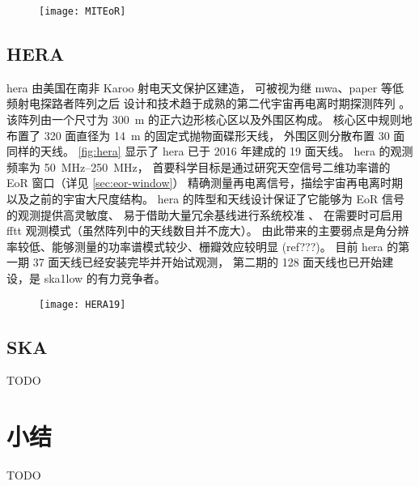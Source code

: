 \begin{figure}[!htb]
  \centering
  \texttt{[image: MITEoR]}
  \label{fig:miteor}
\end{figure}

\subsection{HERA}

\acf{hera} 由美国在南非 Karoo 射电天文保护区建造，
可被视为继 \acs{mwa}、\ac{paper} 等低频射电探路者阵列之后
设计和技术趋于成熟的第二代宇宙再电离时期探测阵列 \cite{deboer2017}。
该阵列由一个尺寸为 \SI{300}{\meter} 的正六边形核心区以及外围区构成。
核心区中规则地布置了 320 面直径为 \SI{14}{\meter} 的固定式抛物面碟形天线，
外围区则分散布置 30 面同样的天线。
\autoref{fig:hera} 显示了 \acs{hera} 已于 2016 年建成的 19 面天线。
\acs{hera} 的观测频率为 \SIrange{50}{250}{\MHz}，
首要科学目标是通过研究天空信号二维功率谱的 EoR 窗口（详见 \autoref{sec:eor-window}）
精确测量再电离信号，描绘宇宙再电离时期以及之前的宇宙大尺度结构。
\acs{hera} 的阵型和天线设计保证了它能够为 EoR 信号的观测提供高灵敏度、
易于借助大量冗余基线进行系统校准 \cite{dillon2016}、
在需要时可启用 \acs{fftt} 观测模式（虽然阵列中的天线数目并不庞大）\cite{tegmark2009}。
由此带来的主要弱点是角分辨率较低、能够测量的功率谱模式较少、栅瓣效应较明显 (ref???)。
目前 \acs{hera} 的第一期 37 面天线已经安装完毕并开始试观测，
第二期的 128 面天线也已开始建设，是 \acs{ska1low} 的有力竞争者。

\begin{figure}[!htb]
  \centering
  \texttt{[image: HERA19]}
  \label{fig:hera}
\end{figure}

\subsection{SKA}

TODO


\section{小结}

TODO


